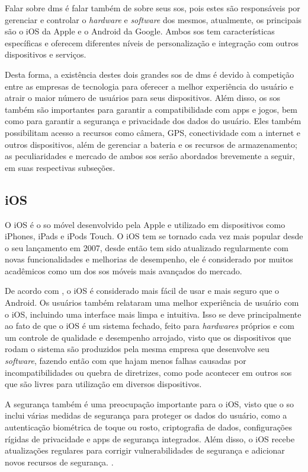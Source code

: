 Falar sobre \acp{dm} é falar também de sobre seus \acp{so}, pois estes são responsáveis por gerenciar e controlar o \textit{hardware}  e \textit{software} dos mesmos, atualmente, os principais são o iOS da Apple e o Android da Google. Ambos \acp{so} tem características específicas e oferecem diferentes níveis de personalização e integração com outros dispositivos e serviços.

Desta forma, a existência destes dois grandes \acp{so} de \acp{dm} é devido à competição entre as empresas de tecnologia para oferecer a melhor experiência do usuário e atrair o maior número de usuários para seus dispositivos. Além disso, os \acp{so} também são importantes para garantir a compatibilidade com \acp{app} e jogos, bem como para garantir a segurança e privacidade dos dados do usuário. Eles também possibilitam acesso a recursos como câmera, GPS, conectividade com a internet e outros dispositivos, além de gerenciar a bateria e os recursos de armazenamento; as peculiaridades e mercado de ambos \acp{so} serão abordados brevemente a seguir, em suas respectivas subseções.

\subsection{iOS}\label{ssec:ios}
O iOS é o \ac{so} móvel desenvolvido pela Apple e utilizado em dispositivos como iPhones, iPads e iPods Touch. O iOS tem se tornado cada vez mais popular desde o seu lançamento em 2007, desde então tem sido atualizado regularmente com novas funcionalidades e melhorias de desempenho, ele é considerado por muitos acadêmicos como um dos \acp{so} móveis mais avançados do mercado.

De acordo com \citet{borges2017analise}, o iOS é considerado mais fácil de usar e mais seguro que o Android. Os usuários também relataram uma melhor experiência de usuário com o iOS, incluindo uma interface mais limpa e intuitiva. Isso se deve principalmente ao fato de que o iOS é um sistema fechado, feito para \textit{hardwares} próprios e com um controle de qualidade e desempenho arrojado, visto que os dispositivos que rodam o sistema são produzidos pela mesma empresa que desenvolve seu \textit{software}, fazendo então com que hajam menos falhas causadas por incompatibilidades ou quebra de diretrizes, como pode acontecer em outros \acp{so} que são livres para utilização em diversos dispositivos.

A segurança também é uma preocupação importante para o iOS, visto que o \ac{so} inclui várias medidas de segurança para proteger os dados do usuário, como a autenticação biométrica de toque ou rosto, criptografia de dados, configurações rígidas de privacidade e \acp{app} de segurança integrados. Além disso, o iOS recebe atualizações regulares para corrigir vulnerabilidades de segurança e adicionar novos recursos de segurança. \cite{ahvanooey2020survey}. 

